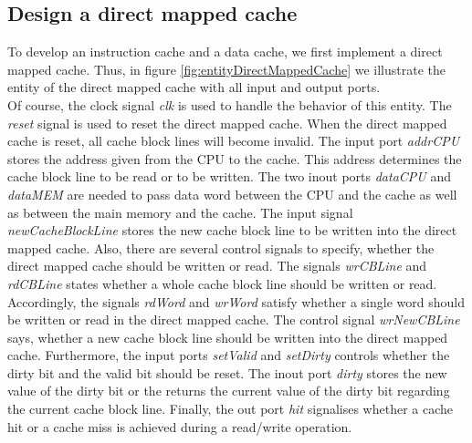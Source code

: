 \newpage
\subsection{Design a direct mapped cache}
To develop an instruction cache and a data cache, we first implement a direct mapped cache. Thus, in figure \ref{fig:entityDirectMappedCache} we illustrate the entity of the direct mapped cache with all input and output ports.\\
Of course, the clock signal \textit{clk} is used to handle the behavior of this entity. The \textit{reset} signal is used to reset the direct mapped cache. When the direct mapped cache is reset, all cache block lines will become invalid. The input port \textit{addrCPU} stores the address given from the CPU to the cache. This address determines the cache block line to be read or to be written. The two inout ports \textit{dataCPU} and \textit{dataMEM} are needed to pass data word between the CPU and the cache as well as between the main memory and the cache. The input signal \textit{newCacheBlockLine} stores the new cache block line to be written into the direct mapped cache. Also, there are several control signals to specify, whether the direct mapped cache should be written or read. The signals \textit{wrCBLine} and \textit{rdCBLine} states whether a whole cache block line should be written or read. Accordingly, the signals \textit{rdWord} and \textit{wrWord} satisfy whether a single word should be written or read in the direct mapped cache. The control signal \textit{wrNewCBLine} says, whether a new cache block line should be written into the direct mapped cache. Furthermore, the input ports \textit{setValid} and \textit{setDirty} controls whether the dirty bit and the valid bit should be reset. The inout port \textit{dirty} stores the new value of the dirty bit or the returns the current value of the dirty bit regarding the current cache block line. Finally, the out port \textit{hit} signalises whether a cache hit or a cache miss is achieved during a read/write operation.

